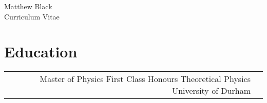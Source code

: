 \documentclass[10pt]{article} %
\begin{document}
\begin{paracol}{2} %


\parbox[top][0.12\textheight][c]{\linewidth}{ %
	\vspace{-0.04\textheight} %
	\centering %
	{\sffamily\Huge Matthew Black}\\\medskip %
	{\Huge\color{headings}\cvtextfont Curriculum Vitae}
}

\section{Education}





\begin{supertabular}{rp{6.7cm}} %


	{Master of Physics} %
    {First Class Honours}
	{Theoretical Physics} %
	{University of Durham} %


\end{supertabular}
\end{paracol}
\end{document}

